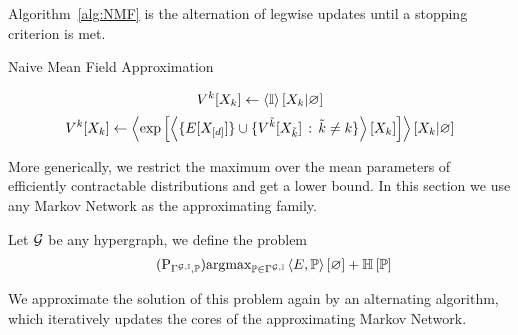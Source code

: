 Algorithm~\ref{alg:NMF} is the alternation of legwise updates until a stopping criterion is met.

\begin{algorithm}[h!]
\caption{Naive Mean Field Approximation}\label{alg:NMF}
\begin{algorithmic}
\For{$\catenumeratorin$}
	\State 
		\[ V^{k}[X_{k}] 
		\leftarrow \left\langle \mathbb{I}\right\rangle \left[ X_{k} | \varnothing \right]  \]
\EndFor
{}
	\For{$\catenumeratorin$}
		\State 
			\[ V^{k}[X_{k}] 
			\leftarrow \left\langle  \mathrm{exp}\left[ \left\langle  \{E[X_{[d]}] \}\cup
				\{V^{\tilde{k}}[X_{\tilde{k}}] \, : \, \tilde{k}\neq k\} \right\rangle \left[ X_{k} \right] \right]
			\right\rangle \left[ X_{k} | \varnothing \right] \]
\EndFor
\EndWhile
\end{algorithmic}
\end{algorithm}



More generically, we restrict the maximum over the mean parameters of efficiently contractable distributions and get a lower bound.
In this section we use any Markov Network as the approximating family. 

Let $\mathcal{G}$ be any hypergraph, we define the problem
\begin{align}\tag{$\mathrm{P}_{\mnexpfamily, \probtensor}$}\label{prob:structuredApproximation}
	\argmax_{\probtensor\in \mnexpfamily} \sbcontraction{\energytensor,\probtensor} + \sentropyof{\probtensor}
\end{align}

We approximate the solution of this problem again by an alternating algorithm, which iteratively updates the cores of the approximating Markov Network. 

